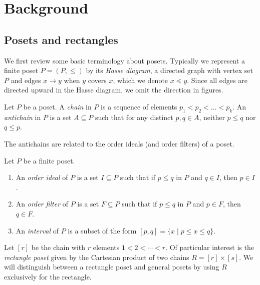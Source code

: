 \documentclass[ALCO,Unicode,published]{cedram}
\numberwithin{equation}{section}
\begin{document}
\section{Background} \label{section:background}

\subsection{Posets and rectangles}
\label{subsection:posets}

We first review some basic terminology about posets. Typically we represent a finite poset $P=(P, \leq)$ by its \emph{Hasse diagram}, a directed graph with vertex set $P$ and edges $x \to y$ when $y$ covers $x$, which we denote $x \lessdot y$. Since all edges are directed upward in the Hasse diagram, we omit the direction in figures.

\begin{Def}
Let $P$ be a poset. A \emph{chain} in $P$ is a sequence of elements $p_1 < p_2 < \dots < p_k$. An \emph{antichain} in $P$ is a set $A \subseteq P$ such that for any distinct $p,q \in A$, neither $p \leq q$ nor $q \leq p$.
\end{Def}

The antichains are related to the order ideals (and order filters) of a poset. 


\begin{Def} Let $P$ be a finite poset.
\begin{enumerate}
    \item An \emph{order ideal} of $P$ is a set $I \subseteq P$ such that if $p \leq q$ in $P$ and $q \in I$, then $p \in I$. %
    \item An \emph{order filter} of $P$ is a set $F \subseteq P$ such that if $p \leq q$ in $P$ and $p \in F$, then $q \in F$. %
    \item An \emph{interval} of $P$ is a subset of the form $[p,q]=\{ x \mid p \leq x \leq q \}$.
\end{enumerate}
\end{Def}

Let $[r]$ be the chain with $r$ elements $1 < 2 < \cdots < r$. Of particular interest is the \emph{rectangle poset} given by the Cartesian product of two chains $R = [r] \times [s]$. We will distinguish between a rectangle poset and general posets by using $R$ exclusively for the rectangle. 
\end{document}
